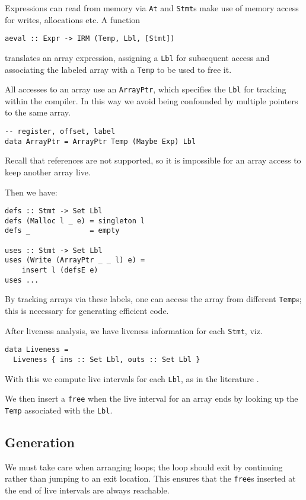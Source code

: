 \documentclass[sigplan,screen,anonymous]{acmart}
\begin{document}
Expressions can read from memory via {\tt At} and {\tt Stmt}s make use of memory access for writes, allocations etc. A function

\begin{verbatim}
aeval :: Expr -> IRM (Temp, Lbl, [Stmt])
\end{verbatim}
translates an array expression, assigning a {\tt Lbl} for subsequent access and associating the labeled array with a {\tt Temp} to be used to free it.

All accesses to an array use an {\tt ArrayPtr}, which specifies the {\tt Lbl} for tracking within the compiler. In this way we avoid being confounded by multiple pointers to the same array. 

\begin{verbatim}
-- register, offset, label
data ArrayPtr = ArrayPtr Temp (Maybe Exp) Lbl
\end{verbatim}

Recall that references are not supported, so it is impossible for an array access to keep another array live.

Then we have:

\begin{verbatim}
defs :: Stmt -> Set Lbl
defs (Malloc l _ e) = singleton l
defs _              = empty

uses :: Stmt -> Set Lbl
uses (Write (ArrayPtr _ _ l) e) =
    insert l (defsE e)
uses ...
\end{verbatim}

By tracking arrays via these labels, one can access the array from different {\tt Temp}s; this is necessary for generating efficient code.

After liveness analysis, we have liveness information for each {\tt Stmt}, viz.

\begin{verbatim}
data Liveness =
  Liveness { ins :: Set Lbl, outs :: Set Lbl }
\end{verbatim}

With this we compute live intervals for each {\tt Lbl}, as in the literature \cite{poletto1999}.

We then insert a {\tt free} when the live interval for an array ends by looking up the {\tt Temp} associated with the {\tt Lbl}.

\subsection{Generation}

We must take care when arranging loops; the loop should exit by continuing rather than jumping to an exit location. This ensures that the {\tt free}s inserted at the end of live intervals are always reachable.
\end{document}
